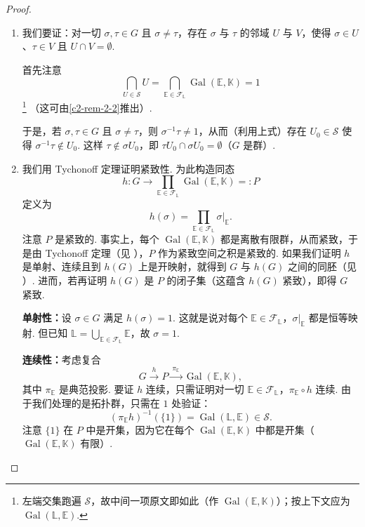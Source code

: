 \begin{proof}
\begin{enumerate}
    \item 我们要证：对一切 $\sigma,\tau\in G$ 且 $\sigma\neq\tau$，存在 $\sigma$ 与 $\tau$ 的邻域 $U$ 与 $V$，使得 $\sigma\in U$、$\tau\in V$ 且 $U\cap V=\emptyset$.

    首先注意
    \[
    \bigcap_{U\in\mathcal{S}}U=\bigcap_{\mathbb{E}\in\mathcal{F}_{\mathbb{L}}}\operatorname{Gal}(\mathbb{E},\mathbb{K})=1
    \]\footnote{左端交集跑遍 $\mathcal{S}$，故中间一项原文即如此（作 $\operatorname{Gal}(\mathbb{E},\mathbb{K})$）；按上下文应为 $\operatorname{Gal}(\mathbb{L},\mathbb{E})$.}
    （这可由\autoref{c2-rem-2-2}推出）.

    于是，若 $\sigma,\tau\in G$ 且 $\sigma\neq\tau$，则 $\sigma^{-1}\tau\neq 1$，从而（利用上式）存在 $U_{0}\in\mathcal{S}$ 使得 $\sigma^{-1}\tau\notin U_{0}$. 这样 $\tau\notin\sigma U_{0}$，即 $\tau U_{0}\cap\sigma U_{0}=\emptyset$（$G$ 是群）.
    \item 我们用 Tychonoff 定理证明紧致性. 为此构造同态
    \[
    h:G\to\prod_{\mathbb{E}\in\mathcal{F}_{\mathbb{L}}}\operatorname{Gal}(\mathbb{E},\mathbb{K})=:P
    \]
    定义为
    \[
    h(\sigma)=\prod_{\mathbb{E}\in\mathcal{F}_{\mathbb{L}}}\sigma|_{\mathbb{E}}.
    \]
    注意 $P$ 是紧致的. 事实上，每个 $\operatorname{Gal}(\mathbb{E},\mathbb{K})$ 都是离散有限群，从而紧致，于是由 Tychonoff 定理（见 \cite[Theorem~37.3]{mun75}），$P$ 作为紧致空间之积是紧致的. 如果我们证明 $h$ 是单射、连续且到 $h(G)$ 上是开映射，就得到 $G$ 与 $h(G)$ 之间的同胚（见 \cite[Theorem~26.6]{mun75}）. 进而，若再证明 $h(G)$ 是 $P$ 的闭子集（这蕴含 $h(G)$ 紧致），即得 $G$ 紧致.

    \textbf{单射性：}设 $\sigma\in G$ 满足 $h(\sigma)=1$. 这就是说对每个 $\mathbb{E}\in\mathcal{F}_{\mathbb{L}}$，$\sigma|_{\mathbb{E}}$ 都是恒等映射. 但已知 $\mathbb{L}=\bigcup_{\mathbb{E}\in\mathcal{F}_{\mathbb{L}}}\mathbb{E}$，故 $\sigma=1$.

    \textbf{连续性：}考虑复合
    \[
    G\xrightarrow{\ h\ }P\xrightarrow{\ \pi_{\mathbb{E}}\ }\operatorname{Gal}(\mathbb{E},\mathbb{K}),
    \]
    其中 $\pi_{\mathbb{E}}$ 是典范投影. 要证 $h$ 连续，只需证明对一切 $\mathbb{E}\in\mathcal{F}_{\mathbb{L}}$，$\pi_{\mathbb{E}}\circ h$ 连续. 由于我们处理的是拓扑群，只需在 $1$ 处验证：
    \[
    (\pi_{\mathbb{E}}h)^{-1}(\{1\})=\operatorname{Gal}(\mathbb{L},\mathbb{E})\in\mathcal{S}.
    \]
    注意 $\{1\}$ 在 $P$ 中是开集，因为它在每个 $\operatorname{Gal}(\mathbb{E},\mathbb{K})$ 中都是开集（$\operatorname{Gal}(\mathbb{E},\mathbb{K})$ 有限）.


\end{enumerate}
\end{proof}
